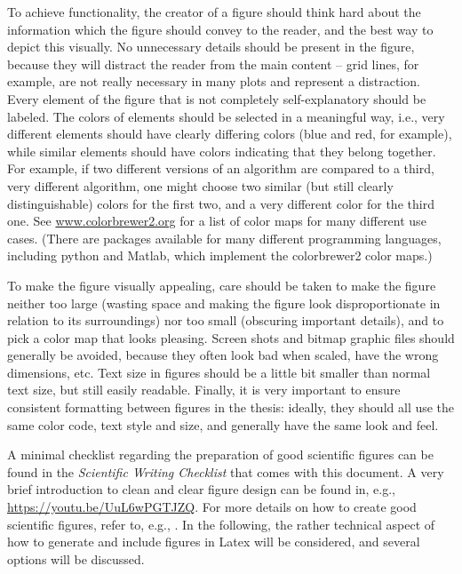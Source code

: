 To achieve functionality, the creator of a figure should think hard about the information which the figure should convey to the reader, and the best way to depict this visually. 
No unnecessary details should be present in the figure, because they will distract the reader from the main content -- grid lines, for example, are not really necessary in many plots and represent a distraction.
Every element of the figure that is not completely self-explanatory should be labeled.
The colors of elements should be selected in a meaningful way, i.e., very different elements should have clearly differing colors (blue and red, for example), while similar elements should have colors indicating that they belong together.
For example, if two different versions of an algorithm are compared to a third, very different algorithm, one might choose two similar (but still clearly distinguishable) colors for the first two, and a very different color for the third one.
See \url{www.colorbrewer2.org} for a list of color maps for many different use cases.
(There are packages available for many different programming languages, including python and Matlab, which implement the colorbrewer2 color maps.)

To make the figure visually appealing, care should be taken to make the figure neither too large (wasting space and making the figure look disproportionate in relation to its surroundings) nor too small (obscuring important details), and to pick a  color map that looks pleasing.
Screen shots and bitmap graphic files should generally be avoided, because they often look bad when scaled, have the wrong dimensions, etc.
Text size in figures should be a little bit smaller than normal text size, but still easily readable.
Finally, it is very important to ensure consistent formatting between figures in the thesis: ideally, they should all use the same color code, text style and size, and generally have the same \glqq look and feel\grqq.

A minimal checklist regarding the preparation of good scientific figures can be found in the \emph{Scientific Writing Checklist} that comes with this document.
A very brief introduction to clean and clear figure design can be found in, e.g., \url{https://youtu.be/UuL6wPGTJZQ}.
For more details on how to create good scientific figures, refer to, e.g., \textcite{Tufte1990, Ware2008, Few2012, Rougier2014}.
In the following, the rather technical aspect of how to generate and include figures in Latex will be considered, and several options will be discussed.

